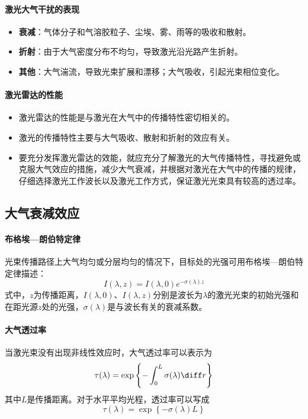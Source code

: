 \paragraph{激光大气干扰的表现}
\begin{itemize}
	\item \textbf{衰减}：气体分子和气溶胶粒子、尘埃、雾、雨等的吸收和散射。
	\item \textbf{折射}：由于大气密度分布不均匀，导致激光沿光路产生折射。
	\item \textbf{其他}：大气湍流，导致光束扩展和漂移；大气吸收，引起光束相位变化。
\end{itemize} %

\paragraph{激光雷达的性能}
\begin{itemize}
	\item 激光雷达的性能是与激光在大气中的传播特性密切相关的。
	\item 激光的传播特性主要与大气吸收、散射和折射的效应有关。
	\item 要充分发挥激光雷达的效能，就应充分了解激光的大气传播特性，寻找避免或克服大气效应的措施，减少大气衰减，并根据对激光在大气中的传播的规律，仔细选择激光工作波长以及激光工作方式，保证激光光束具有较高的透过率。
\end{itemize}

\subsection{大气衰减效应} %

\paragraph{布格埃—朗伯特定律}光束传播路径上大气均匀或分层均匀的情况下，目标处的光强可用布格埃—朗伯特定律描述：
\begin{equation}
I(\lambda,z) = I(\lambda,0)e^{-\sigma(\lambda)z}
\end{equation}
式中，$ z $为传播距离，$ I(\lambda,0) $、$ I(\lambda,z) $分别是波长为$ \lambda $的激光光束的初始光强和在距光源$ z $处的光强，$ \sigma(\lambda) $是与波长有关的衰减系数。

\paragraph{大气透过率}当激光束没有出现非线性效应时，大气透过率可以表示为
\begin{equation}
\tau(\lambda) = \exp\left\lbrace -\int_{0}^{L}\sigma(\lambda)\diff r \right\rbrace 
\end{equation}
其中$ L $是传播距离。对于水平平均光程，透过率可以写成
\begin{equation}
\tau(\lambda) = \exp\left\lbrace - \sigma(\lambda)L \right\rbrace
\end{equation}

